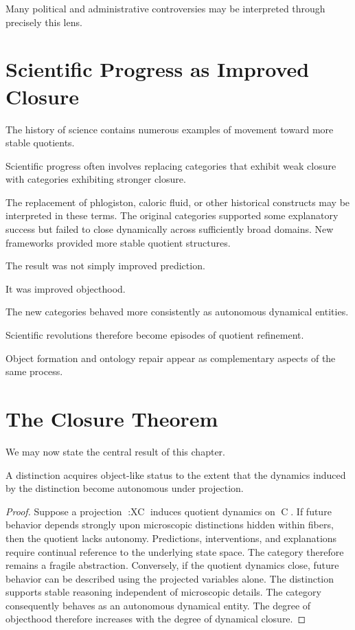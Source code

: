 \documentclass[11pt,oneside,openany]{book}
\begin{document}
Many political and administrative controversies may be interpreted through precisely this lens.

\section{Scientific Progress as Improved Closure}

The history of science contains numerous examples of movement toward more stable quotients.

Scientific progress often involves replacing categories that exhibit weak closure with categories exhibiting stronger closure.

The replacement of phlogiston, caloric fluid, or other historical constructs may be interpreted in these terms. The original categories supported some explanatory success but failed to close dynamically across sufficiently broad domains. New frameworks provided more stable quotient structures.

The result was not simply improved prediction.

It was improved objecthood.

The new categories behaved more consistently as autonomous dynamical entities.

Scientific revolutions therefore become episodes of quotient refinement.

Object formation and ontology repair appear as complementary aspects of the same process.

\section{The Closure Theorem}

We may now state the central result of this chapter.

\begin{theorem}

A distinction acquires object-like status to the extent that the dynamics induced by the distinction become autonomous under projection.

\end{theorem}

\begin{proof}

Suppose a projection \pi:X\rightarrow C induces quotient dynamics on C. If future behavior depends strongly upon microscopic distinctions hidden within fibers, then the quotient lacks autonomy. Predictions, interventions, and explanations require continual reference to the underlying state space. The category therefore remains a fragile abstraction. Conversely, if the quotient dynamics close, future behavior can be described using the projected variables alone. The distinction supports stable reasoning independent of microscopic details. The category consequently behaves as an autonomous dynamical entity. The degree of objecthood therefore increases with the degree of dynamical closure.

\end{proof}
\end{document}
